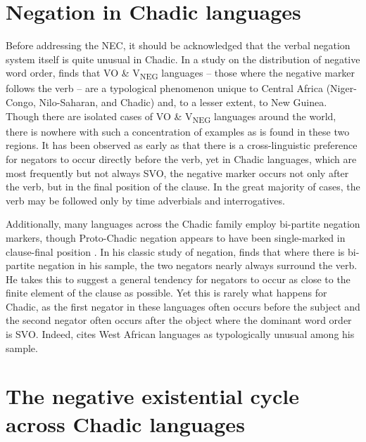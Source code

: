 \documentclass[output=paper,draft,draftmode,colorlinks,citecolor=brown]{langscibook}
\begin{document}
\section{Negation in Chadic languages}\label{sec:3:2}

Before addressing the NEC, it should be acknowledged that the verbal
negation system itself is quite unusual in Chadic. In a study on the
distribution of negative word order, \citet{Dryer2009} finds that VO \&
V\textsubscript{NEG} languages -- those where the negative marker follows
the verb -- are a typological phenomenon unique to Central Africa
(Niger-Congo, Nilo-Saharan, and Chadic) and, to a
lesser extent, to New Guinea. Though there are isolated cases of VO \&
V\textsubscript{NEG} languages around the world, there is nowhere with such
a concentration of examples as is found in these two regions. It has been
observed as early as \citet{Jespersen1917} that there is a cross-linguistic
preference for negators to occur directly before the verb, yet in Chadic
languages, which are most frequently but not always SVO, the negative marker occurs not only
after the verb, but in the final position of the clause. In the great
majority of cases, the verb may be followed only by time adverbials and
interrogatives. 

Additionally, many languages across the Chadic family employ bi-partite negation
markers, though Proto-Chadic negation appears to have been single-mar\-ked in clau\-se-fi\-nal
position \citep{Newman1977}. In his classic study of negation,
\citet[92]{Dahl1979} finds that where there is bi-par\-ti\-te negation in his sample,
the two negators nearly always surround the verb. He takes this to suggest
a general tendency for negators to occur as close to the finite element of
the clause as possible. Yet this is rarely what happens
 for Chadic, as the
first negator in these languages often occurs before the subject and the second
negator often occurs after the object where the dominant word order is SVO.
Indeed, \citet[95]{Dahl1979} cites West African languages as typologically
unusual among his sample.


\section{The negative existential cycle across Chadic languages}\label{sec:3:3}
\end{document}
